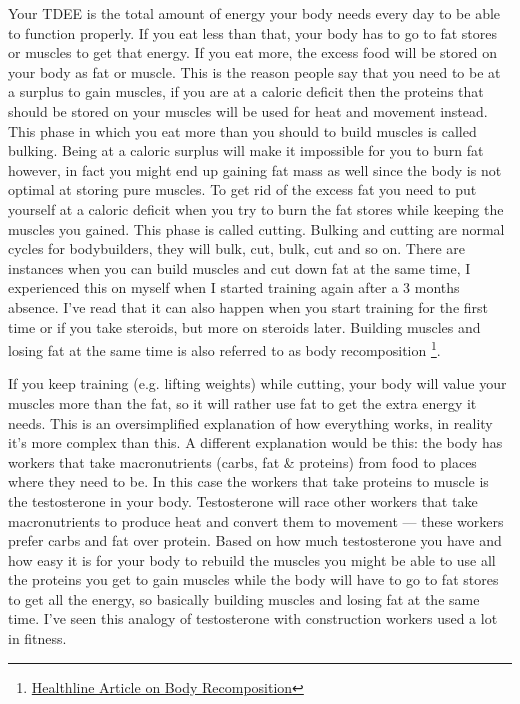 \documentclass[openany, 12pt]{book}
\begin{document}
	Your TDEE is the total amount of energy your body needs every day to be able to function properly. If you eat less than that, your body has to go to fat stores or muscles to get that energy.
        If you eat more, the excess food will be stored on your body as fat or muscle. This is the reason people say that you need to be at a surplus to gain muscles, if you are at a caloric deficit
        then the proteins that should be stored on your muscles will be used for heat and movement instead. This phase in which you eat more than you should to build muscles is called bulking.
        Being at a caloric surplus will make it impossible for you to burn fat however, in fact you might end up gaining fat mass as well since the body is not optimal at storing pure muscles.
        To get rid of the excess fat you need to put yourself at a caloric deficit when you try to burn the fat stores while keeping the muscles you gained. This phase is called cutting. Bulking
        and cutting are normal cycles for bodybuilders, they will bulk, cut, bulk, cut and so on. There are instances when you can build muscles and cut down fat at the same time, I experienced this on
        myself when I started training again after a 3 months absence. I've read that it can also happen when you start training for the first time or if you take steroids, but more on steroids later.
        Building muscles and losing fat at the same time is also referred to as body recomposition
        \footnote{\href{https://www.healthline.com/nutrition/body-recomposition\#how-it-works}{Healthline Article on Body Recomposition}}.
	
	If you keep training (e.g. lifting weights) while cutting, your body will value your muscles more than the fat, so it will rather use fat to get the extra energy it needs. This is an
        oversimplified explanation of how everything works, in reality it's more complex than this. A different explanation would be this: the body has workers that take macronutrients (carbs, fat \&
        proteins) from food to places where they need to be. In this case the workers that take proteins to muscle is the testosterone in your body. Testosterone will race other workers that take
        macronutrients to produce heat and convert them to movement --- these workers prefer carbs and fat over protein. Based on how much testosterone you have and how easy it is for your body to
        rebuild the muscles you might be able to use all the proteins you get to gain muscles while the body will have to go to fat stores to get all the energy, so basically building muscles and
        losing fat at the same time. I've seen this analogy of testosterone with construction workers used a lot in fitness. 
	
\end{document}
